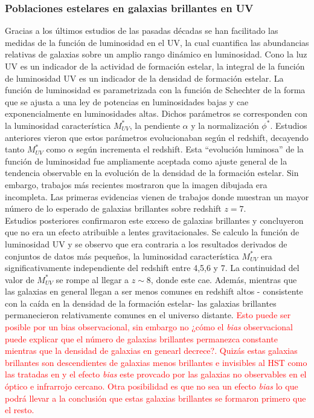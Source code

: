 \documentclass{article}
\begin{document}
\subsubsection*{Poblaciones estelares en galaxias brillantes en UV}
Gracias a los últimos estudios de las pasadas décadas se han facilitado las medidas de la función de luminosidad en el UV, la cual cuantifica las abundancias relativas de galaxias sobre un amplio rango dinámico en luminosidad. Cono la luz UV es un indicador de la actividad de formación estelar, la integral de la función de luminosidad UV es un indicador de la densidad de formación estelar. La función de luminosidad es parametrizada con la función de Schechter de la forma que se ajusta a una ley de potencias en luminosidades bajas y cae exponencialmente en luminosidades altas. Dichos parámetros se corresponden con la luminosidad característica $M_{UV}^*$, la pendiente $\alpha$ y la normalización $\phi^*$. Estudios anteriores vieron que estos parámetros evolucionaban según el redshift, decayendo tanto $M_{UV}^*$ como $\alpha$ según incrementa el redshift. Esta ``evolución luminosa'' de la función de luminosidad fue ampliamente aceptada como ajuste general de la tendencia observable en la evolución de la densidad de la formación estelar. Sin embargo, trabajos más recientes mostraron que la imagen dibujada era incompleta. Las primeras evidencias vienen de trabajos donde muestran un mayor número de lo esperado de galaxias brillantes sobre redshift $z=7$. \\

Estudios posteriores confirmaron este exceso de galaxias brillantes y concluyeron que no era un efecto atribuible a lentes gravitacionales. Se calculo la función de luminosidad UV y se observo que era contraria a los resultados derivados de conjuntos de datos más pequeños, la luminosidad característica $M_{UV}^*$ era significativamente independiente del redshift entre 4,5,6 y 7. La continuidad del valor de $M_{UV}^*$ se rompe al llegar a $z\sim 8$, donde este cae. Además, mientras que las galaxias en general llegan a ser menos comunes en redshift altos - consistente con la caída en la densidad de la formación estelar- las galaxias brillantes permanecieron relativamente comunes en el universo distante. \textcolor{red}{Esto puede ser posible por un bias observacional, sin embargo no ¿cómo el \textit{bias} observacional puede explicar que el número de galaxias brillantes permanezca constante mientras que la densidad de galaxias en genearl decrece?. Quizás estas galaxias brillantes son descendientes de galaxias menos brillantes e invisibles al HST como las tratadas en \cite{wang2019dominant} y el efecto \textit{bias} este provcado por las galaxias no observables en el óptico e infrarrojo cercano. Otra posibilidad es que no sea un efecto \textit{bias} lo que podrá llevar a la conclusión que estas galaxias brillantes se formaron primero que el resto.}\\
\end{document}
